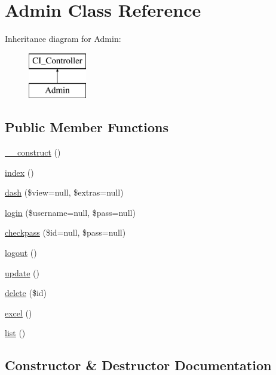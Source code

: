 \hypertarget{class_admin}{}\section{Admin Class Reference}
\label{class_admin}
Inheritance diagram for Admin\+:\begin{figure}[H]
\begin{center}
\leavevmode
\includegraphics[height=2.000000cm]{class_admin}
\end{center}
\end{figure}
\subsection*{Public Member Functions}
\begin{DoxyCompactItemize}
\item 
\mbox{\hyperlink{class_admin_a095c5d389db211932136b53f25f39685}{\+\_\+\+\_\+construct}} ()
\item 
\mbox{\hyperlink{class_admin_a149eb92716c1084a935e04a8d95f7347}{index}} ()
\item 
\mbox{\hyperlink{class_admin_a35f5125b52883ea70807c42282f60b54}{dash}} (\$view=null, \$extras=null)
\item 
\mbox{\hyperlink{class_admin_a3ea73f2d243749d401f168a6dc356528}{login}} (\$username=null, \$pass=null)
\item 
\mbox{\hyperlink{class_admin_a2df41f5feb0a50e8b308f7a7b6b25dfb}{checkpass}} (\$id=null, \$pass=null)
\item 
\mbox{\hyperlink{class_admin_a082405d89acd6835c3a7c7a08a7adbab}{logout}} ()
\item 
\mbox{\hyperlink{class_admin_a842e4774e3b3601a005b995c02f7e883}{update}} ()
\item 
\mbox{\hyperlink{class_admin_a2f8258add505482d7f00ea26493a5723}{delete}} (\$id)
\item 
\mbox{\hyperlink{class_admin_ab619c12069c76b755a2ceae543d527fe}{excel}} ()
\item 
\mbox{\hyperlink{class_admin_a635cee6ce0ca514b13a5e5a9030e5ca8}{list}} ()
\end{DoxyCompactItemize}


\subsection{Constructor \& Destructor Documentation}
\mbox{\label{class_admin_a095c5d389db211932136b53f25f39685}} 
